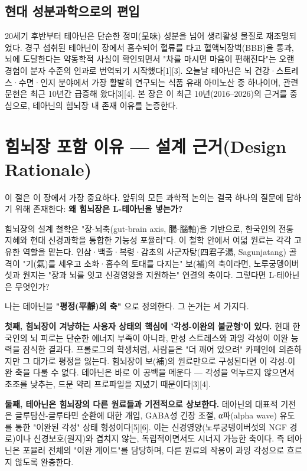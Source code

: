 \documentclass[11pt,oneside]{book}
\begin{document}
\subsection{현대 성분과학으로의 편입}
20세기 후반부터 테아닌은 단순한 정미(呈味) 성분을 넘어 생리활성 물질로 재조명되었다. 경구 섭취된 테아닌이 장에서 흡수되어 혈류를 타고 혈액뇌장벽(BBB)을 통과, 뇌에 도달한다는 약동학적 사실이 확인되면서 "차를 마시면 마음이 편해진다"는 오랜 경험이 분자 수준의 인과로 번역되기 시작했다[1][3]. 오늘날 테아닌은 뇌 건강·스트레스·수면·인지 분야에서 가장 활발히 연구되는 식품 유래 아미노산 중 하나이며, 관련 문헌은 최근 10년간 급증해 왔다[3][4]. 본 장은 이 최근 10년(2016–2026)의 근거를 중심으로, 테아닌의 힘뇌장 내 존재 이유를 논증한다.

\section{힘뇌장 포함 이유 — 설계 근거(Design Rationale)}
이 절은 이 장에서 가장 중요하다. 앞뒤의 모든 과학적 논의는 결국 하나의 질문에 답하기 위해 존재한다: \textbf{왜 힘뇌장은 L-테아닌을 넣는가?}

힘뇌장의 설계 철학은 "장-뇌축(gut-brain axis, 腸-腦軸)을 기반으로, 한국인의 전통 지혜와 현대 신경과학을 통합한 기능성 포뮬러"다. 이 철학 안에서 여덟 원료는 각각 고유한 역할을 맡는다. 인삼·백출·복령·감초의 사군자탕(四君子湯, Sagunjatang) 골격이 "기(氣)를 세우고 소화·흡수의 토대를 다지는" 보(補)의 축이라면, 노루궁뎅이버섯과 원지는 "장과 뇌를 잇고 신경영양을 지원하는" 연결의 축이다. 그렇다면 L-테아닌은 무엇인가?

나는 테아닌을 \textbf{"평정(平靜)의 축"} 으로 정의한다. 그 논거는 세 가지다.

\textbf{첫째, 힘뇌장이 겨냥하는 사용자 상태의 핵심에 '각성-이완의 불균형'이 있다.} 현대 한국인의 뇌 피로는 단순한 에너지 부족이 아니라, 만성 스트레스와 과잉 각성이 이완 능력을 잠식한 결과다. 프롤로그의 학생처럼, 사람들은 "더 깨어 있으려" 카페인에 의존하지만 그 대가로 평정을 잃는다. 힘뇌장이 보(補)의 원료만으로 구성된다면 이 각성-이완 축을 다룰 수 없다. 테아닌은 바로 이 공백을 메운다 — 각성을 억누르지 않으면서 초조를 낮추는, 드문 약리 프로파일을 지녔기 때문이다[3][4].

\textbf{둘째, 테아닌은 힘뇌장의 다른 원료들과 기전적으로 상보한다.} 테아닌의 대표적 기전은 글루탐산-글루타민 순환에 대한 개입, GABA성 긴장 조절, α파(alpha wave) 유도를 통한 "이완된 각성" 상태 형성이다[5][6]. 이는 신경영양(노루궁뎅이버섯의 NGF 경로)이나 신경보호(원지)와 겹치지 않는, 독립적이면서도 시너지 가능한 축이다. 즉 테아닌은 포뮬러 전체의 "이완 게이트"를 담당하며, 다른 원료의 작용이 과잉 각성으로 흐르지 않도록 완충한다.
\end{document}
